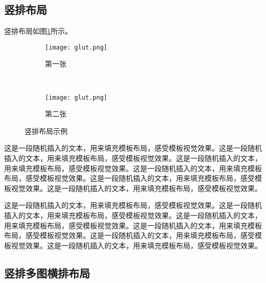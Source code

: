 \subsection{竖排布局}
竖排布局如图\ref{F.glut_col}所示。

\begin{figure}[!htb]
    \centering
    \begin{subfigure}[t]{0.15\linewidth}
        \captionsetup{justification=centering} %
        \begin{minipage}[b]{1\linewidth}
        \texttt{[image: glut.png]}
        \caption{第一张}
        \end{minipage}
    \end{subfigure}\\
    \begin{subfigure}[t]{0.15\linewidth}
        \captionsetup{justification=centering} %
        \begin{minipage}[b]{1\linewidth}
        \texttt{[image: glut.png]}
        \caption{第二张}
        \end{minipage}
    \end{subfigure}
    \caption{竖排布局示例}
    \label{F.glut_col}
\end{figure}

    这是一段随机插入的文本，用来填充模板布局，感受模板视觉效果。这是一段随机插入的文本，用来填充模板布局，感受模板视觉效果。这是一段随机插入的文本，用来填充模板布局，感受模板视觉效果。这是一段随机插入的文本，用来填充模板布局，感受模板视觉效果。这是一段随机插入的文本，用来填充模板布局，感受模板视觉效果。这是一段随机插入的文本，用来填充模板布局，感受模板视觉效果。
    
    这是一段随机插入的文本，用来填充模板布局，感受模板视觉效果。这是一段随机插入的文本，用来填充模板布局，感受模板视觉效果。这是一段随机插入的文本，用来填充模板布局，感受模板视觉效果。这是一段随机插入的文本，用来填充模板布局，感受模板视觉效果。这是一段随机插入的文本，用来填充模板布局，感受模板视觉效果。这是一段随机插入的文本，用来填充模板布局，感受模板视觉效果。

\subsection{竖排多图横排布局}

